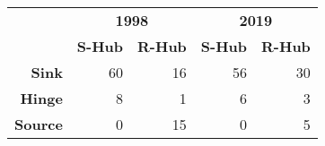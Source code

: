 \begin{tabular}{rrrrr}
\toprule&\multicolumn{2}{c}{\textbf{1998}}&\multicolumn{2}{c}{\textbf{2019}}\\
        &   \textbf{S-Hub} &   \textbf{R-Hub} &   \textbf{S-Hub} &   \textbf{R-Hub} \\
\midrule
   \textbf{Sink} &           60 &           16 &           56 &           30 \\
  \textbf{Hinge} &            8 &            1 &            6 &            3 \\
 \textbf{Source} &            0 &           15 &            0 &            5 \\
\bottomrule
\end{tabular}